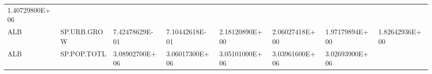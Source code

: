 \documentclass[]{article}
\begin{document}
\begin{longtable}[]{@{}llllllll@{}}
\begin{minipage}[t]{0.11\columnwidth}
1.40729800E+06\strut
\end{minipage}\tabularnewline
\begin{minipage}[t]{0.06\columnwidth}\raggedright
ALB\strut
\end{minipage} & \begin{minipage}[t]{0.08\columnwidth}\raggedright
SP.URB.GROW\strut
\end{minipage} & \begin{minipage}[t]{0.11\columnwidth}\raggedright
7.42478629E-01\strut
\end{minipage} & \begin{minipage}[t]{0.11\columnwidth}\raggedright
7.10442618E-01\strut
\end{minipage} & \begin{minipage}[t]{0.11\columnwidth}\raggedright
2.18120890E+00\strut
\end{minipage} & \begin{minipage}[t]{0.11\columnwidth}\raggedright
2.06027418E+00\strut
\end{minipage} & \begin{minipage}[t]{0.11\columnwidth}\raggedright
1.97179894E+00\strut
\end{minipage} & \begin{minipage}[t]{0.11\columnwidth}\raggedright
1.82642936E+00\strut
\end{minipage}\tabularnewline
\begin{minipage}[t]{0.06\columnwidth}\raggedright
ALB\strut
\end{minipage} & \begin{minipage}[t]{0.08\columnwidth}\raggedright
SP.POP.TOTL\strut
\end{minipage} & \begin{minipage}[t]{0.11\columnwidth}\raggedright
3.08902700E+06\strut
\end{minipage} & \begin{minipage}[t]{0.11\columnwidth}\raggedright
3.06017300E+06\strut
\end{minipage} & \begin{minipage}[t]{0.11\columnwidth}\raggedright
3.05101000E+06\strut
\end{minipage} & \begin{minipage}[t]{0.11\columnwidth}\raggedright
3.03961600E+06\strut
\end{minipage} & \begin{minipage}[t]{0.11\columnwidth}\raggedright
3.02693900E+06\strut
\end{minipage} & \begin{minipage}[t]{0.11\columnwidth}\raggedright

\end{minipage}
\end{longtable}
\end{document}
